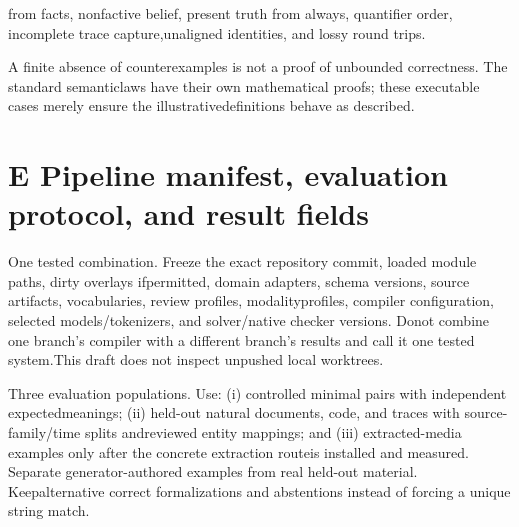 \noindent
from facts, nonfactive belief, present truth from always, quantifier order, incomplete trace capture,\linebreak[4]
unaligned identities, and lossy round trips.\par


\noindent
A finite absence of counterexamples is not a proof of unbounded correctness. The standard semantic\linebreak[4]
laws have their own mathematical proofs; these executable cases merely ensure the illustrative\linebreak[4]
definitions behave as described.\par

\section*{E  Pipeline manifest, evaluation protocol, and result fields}
\noindent
One tested combination. Freeze the exact repository commit, loaded module paths, dirty overlays if\linebreak[4]
permitted, domain adapters, schema versions, source artifacts, vocabularies, review profiles, modality\linebreak[4]
profiles, compiler configuration, selected models/tokenizers, and solver/native checker versions. Do\linebreak[4]
not combine one branch's compiler with a different branch's results and call it one tested system.\linebreak[4]
This draft does not inspect unpushed local worktrees.\par

\noindent
Three evaluation populations. Use: (i) controlled minimal pairs with independent expected\linebreak[4]
meanings; (ii) held-out natural documents, code, and traces with source-family/time splits and\linebreak[4]
reviewed entity mappings; and (iii) extracted-media examples only after the concrete extraction route\linebreak[4]
is installed and measured. Separate generator-authored examples from real held-out material. Keep\linebreak[4]
alternative correct formalizations and abstentions instead of forcing a unique string match.\par


